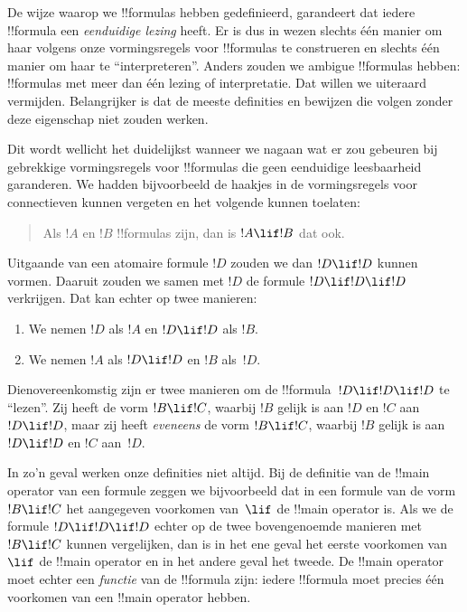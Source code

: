 \documentclass[openany]{memoir}
\begin{document}
\begin{explain}
De wijze waarop we !!{formula}s hebben gedefinieerd, garandeert dat
iedere !!{formula} een \emph{eenduidige lezing} heeft. Er is dus in
wezen slechts één manier om haar volgens onze vormingsregels voor
!!{formula}s te construeren en slechts één manier om haar te
``interpreteren''. Anders zouden we ambigue !!{formula}s hebben:
!!{formula}s met meer dan één lezing of interpretatie. Dat willen we
uiteraard vermijden. Belangrijker is dat de meeste definities en
bewijzen die volgen zonder deze eigenschap niet zouden werken.

Dit wordt wellicht het duidelijkst wanneer we nagaan wat er zou
gebeuren bij gebrekkige vormingsregels voor !!{formula}s die geen
eenduidige leesbaarheid garanderen. We hadden bijvoorbeeld de haakjes
in de vormingsregels voor connectieven kunnen vergeten en het volgende
kunnen toelaten:
\begin{quote}
Als $!A$ en $!B$ !!{formula}s zijn, dan is $!A \lif !B$ dat ook.
\end{quote}
Uitgaande van een atomaire formule $!D$ zouden we dan $!D \lif !D$
kunnen vormen. Daaruit zouden we samen met $!D$ de formule $!D \lif !D
\lif !D$ verkrijgen. Dat kan echter op twee manieren:
\begin{enumerate}
\item We nemen $!D$ als $!A$ en $!D \lif !D$ als $!B$.
\item We nemen $!A$ als $!D \lif !D$ en $!B$ als~$!D$.  
\end{enumerate}
Dienovereenkomstig zijn er twee manieren om de !!{formula}~$!D \lif !D
\lif !D$ te ``lezen''. Zij heeft de vorm $!B \lif !C$, waarbij $!B$
gelijk is aan $!D$ en $!C$ aan $!D \lif !D$, maar zij heeft
\emph{eveneens} de vorm $!B \lif !C$, waarbij $!B$ gelijk is aan $!D
\lif !D$ en $!C$ aan~$!D$.

In zo'n geval werken onze definities niet altijd. Bij de definitie van
de !!{main operator} van een formule zeggen we bijvoorbeeld dat in een
formule van de vorm $!B \lif !C$ het aangegeven voorkomen van~$\lif$
de !!{main operator} is. Als we de formule $!D \lif !D \lif !D$ echter
op de twee bovengenoemde manieren met $!B \lif !C$ kunnen vergelijken,
dan is in het ene geval het eerste voorkomen van $\lif$ de !!{main
operator} en in het andere geval het tweede. De !!{main operator} moet
echter een \emph{functie} van de !!{formula} zijn: iedere !!{formula}
moet precies één voorkomen van een !!{main operator} hebben.
\end{explain}
\end{document}
